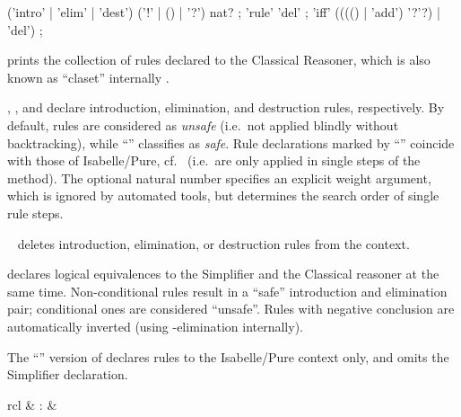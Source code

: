 \begin{isabellebody}
\begin{isamarkuptext}
  \begin{rail}
    ('intro' | 'elim' | 'dest') ('!' | () | '?') nat?
    ;
    'rule' 'del'
    ;
    'iff' (((() | 'add') '?'?) | 'del')
    ;
  \end{rail}

  \begin{descr}

  \item [\mbox{\isa{\isacommand{print{\isacharunderscore}claset}}}] prints the collection of rules
  declared to the Classical Reasoner, which is also known as
  ``claset'' internally \cite{isabelle-ref}.
  
  \item [\mbox{\isa{intro}}, \mbox{\isa{elim}}, and \mbox{\isa{dest}}]
  declare introduction, elimination, and destruction rules,
  respectively.  By default, rules are considered as \emph{unsafe}
  (i.e.\ not applied blindly without backtracking), while ``\isa{{\isachardoublequote}{\isacharbang}{\isachardoublequote}}'' classifies as \emph{safe}.  Rule declarations marked by
  ``\isa{{\isachardoublequote}{\isacharquery}{\isachardoublequote}}'' coincide with those of Isabelle/Pure, cf.\
   (i.e.\ are only applied in single steps
  of the \mbox{\isa{rule}} method).  The optional natural number
  specifies an explicit weight argument, which is ignored by automated
  tools, but determines the search order of single rule steps.

  \item [\mbox{\isa{rule}}~\isa{del}] deletes introduction,
  elimination, or destruction rules from the context.

  \item [\mbox{\isa{iff}}] declares logical equivalences to the
  Simplifier and the Classical reasoner at the same time.
  Non-conditional rules result in a ``safe'' introduction and
  elimination pair; conditional ones are considered ``unsafe''.  Rules
  with negative conclusion are automatically inverted (using \isa{{\isachardoublequote}{\isasymnot}{\isachardoublequote}}-elimination internally).

  The ``\isa{{\isachardoublequote}{\isacharquery}{\isachardoublequote}}'' version of \mbox{} declares rules to
  the Isabelle/Pure context only, and omits the Simplifier
  declaration.

  \end{descr}%
\end{isamarkuptext}%
\isamarkuptrue%
%
\isamarkuptrue%
%
\begin{isamarkuptext}%
\begin{matharray}{rcl}
    \mbox{} & : & \isaratt \\
  \end{matharray}


\end{isamarkuptext}
\end{isabellebody}

